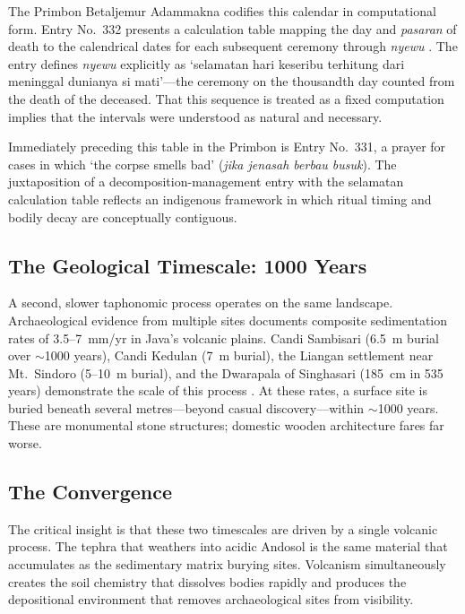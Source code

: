 \documentclass[12pt,a4paper]{article}
\begin{document}
The Primbon Betaljemur Adammakna codifies this calendar in computational form. Entry No.~332 presents a calculation table mapping the day and \textit{pasaran} of death to the calendrical dates for each subsequent ceremony through \textit{nyewu} \citep[245--246]{soemodidjojo_1994}. The entry defines \textit{nyewu} explicitly as `selamatan hari keseribu terhitung dari meninggal dunianya si mati'---the ceremony on the thousandth day counted from the death of the deceased. That this sequence is treated as a fixed computation implies that the intervals were understood as natural and necessary.

Immediately preceding this table in the Primbon is Entry No.~331, a prayer for cases in which `the corpse smells bad' (\textit{jika jenasah berbau busuk}). The juxtaposition of a decomposition-management entry with the selamatan calculation table reflects an indigenous framework in which ritual timing and bodily decay are conceptually contiguous.

\subsection{The Geological Timescale: 1000 Years}

A second, slower taphonomic process operates on the same landscape. Archaeological evidence from multiple sites documents composite sedimentation rates of 3.5--7~mm/yr in Java's volcanic plains. Candi Sambisari (6.5~m burial over $\sim$1000 years), Candi Kedulan (7~m burial), the Liangan settlement near Mt.\ Sindoro (5--10~m burial), and the Dwarapala of Singhasari (185~cm in 535 years) demonstrate the scale of this process \citep{newhall_2000}. At these rates, a surface site is buried beneath several metres---beyond casual discovery---within $\sim$1000 years. These are monumental stone structures; domestic wooden architecture fares far worse.

\subsection{The Convergence}

The critical insight is that these two timescales are driven by a single volcanic process. The tephra that weathers into acidic Andosol is the same material that accumulates as the sedimentary matrix burying sites. Volcanism simultaneously creates the soil chemistry that dissolves bodies rapidly and produces the depositional environment that removes archaeological sites from visibility.
\end{document}
